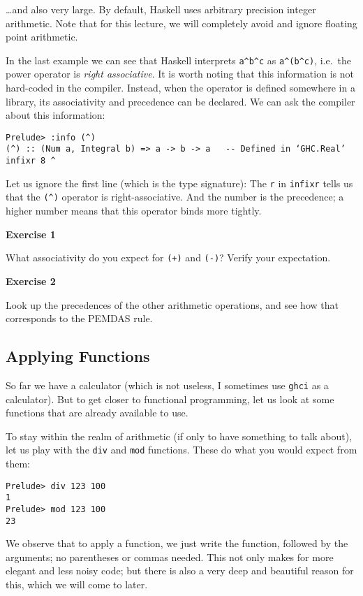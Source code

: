 \documentclass[11pt,
  american,
  DIV13]{article}
\begin{document}
\ldots and also very large. By default, Haskell uses arbitrary precision
integer arithmetic. Note that for this lecture, we will completely avoid
and ignore floating point arithmetic.

In the last example we can see that Haskell interprets
\texttt{a\^{}b\^{}c} as \texttt{a\^{}(b\^{}c)}, i.e.~the power operator
is \emph{right associative}. It is worth noting that this information is
not hard-coded in the compiler. Instead, when the operator is defined
somewhere in a library, its associativity and precedence can be
declared. We can ask the compiler about this information:

\begin{verbatim}
Prelude> :info (^)
(^) :: (Num a, Integral b) => a -> b -> a   -- Defined in ‘GHC.Real’
infixr 8 ^
\end{verbatim}

Let us ignore the first line (which is the type signature): The
\texttt{r} in \texttt{infixr} tells us that the \texttt{(\^{})} operator
is right-associative. And the number is the precedence; a higher number
means that this operator binds more tightly.

\textbf{Exercise 1}

What associativity do you expect for \texttt{(+)} and \texttt{(-)}?
Verify your expectation.

\textbf{Exercise 2}

Look up the precedences of the other arithmetic operations, and see how
that corresponds to the PEMDAS rule.

\hypertarget{applying-functions}{%
\subsection{Applying Functions}\label{applying-functions}}

So far we have a calculator (which is not useless, I sometimes use
\texttt{ghci} as a calculator). But to get closer to functional
programming, let us look at some functions that are already available to
use.

To stay within the realm of arithmetic (if only to have something to
talk about), let us play with the \texttt{div} and \texttt{mod}
functions. These do what you would expect from them:

\begin{verbatim}
Prelude> div 123 100
1
Prelude> mod 123 100
23
\end{verbatim}

We observe that to apply a function, we just write the function,
followed by the arguments; no parentheses or commas needed. This not
only makes for more elegant and less noisy code; but there is also a
very deep and beautiful reason for this, which we will come to later.
\end{document}
